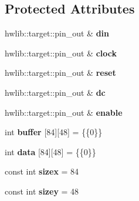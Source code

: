 \subsection*{Protected Attributes}
\begin{DoxyCompactItemize}
\item 
hwlib\+::target\+::pin\+\_\+out \& {\bfseries din}\hypertarget{classnokia5510_a717ebfcb1a3196f31623f7b70c489407}{}\label{classnokia5510_a717ebfcb1a3196f31623f7b70c489407}

\item 
hwlib\+::target\+::pin\+\_\+out \& {\bfseries clock}\hypertarget{classnokia5510_a8397850a3fe1c44972ebe5d40783b343}{}\label{classnokia5510_a8397850a3fe1c44972ebe5d40783b343}

\item 
hwlib\+::target\+::pin\+\_\+out \& {\bfseries reset}\hypertarget{classnokia5510_a547d7c0c12530b9b8eb17bff44b92e6d}{}\label{classnokia5510_a547d7c0c12530b9b8eb17bff44b92e6d}

\item 
hwlib\+::target\+::pin\+\_\+out \& {\bfseries dc}\hypertarget{classnokia5510_a927a4902306dee2f7f633797eeb9c7c6}{}\label{classnokia5510_a927a4902306dee2f7f633797eeb9c7c6}

\item 
hwlib\+::target\+::pin\+\_\+out \& {\bfseries enable}\hypertarget{classnokia5510_a81908ace88b02f3565d856c7aa9b895c}{}\label{classnokia5510_a81908ace88b02f3565d856c7aa9b895c}

\item 
int {\bfseries buffer} \mbox{[}84\mbox{]}\mbox{[}48\mbox{]} = \{\{0\}\}\hypertarget{classnokia5510_a8c219b3be7a12d4de887ebf0df79b9cf}{}\label{classnokia5510_a8c219b3be7a12d4de887ebf0df79b9cf}

\item 
int {\bfseries data} \mbox{[}84\mbox{]}\mbox{[}48\mbox{]} = \{\{0\}\}\hypertarget{classnokia5510_a61b0e090af9da65d16b9846e9d487312}{}\label{classnokia5510_a61b0e090af9da65d16b9846e9d487312}

\item 
const int {\bfseries sizex} = 84\hypertarget{classnokia5510_a70bed987c215e9004fbf23211aff9d92}{}\label{classnokia5510_a70bed987c215e9004fbf23211aff9d92}

\item 
const int {\bfseries sizey} = 48\hypertarget{classnokia5510_a4342f1b52b9a3a4f80471a57aab7674c}{}\label{classnokia5510_a4342f1b52b9a3a4f80471a57aab7674c}

\end{DoxyCompactItemize}


